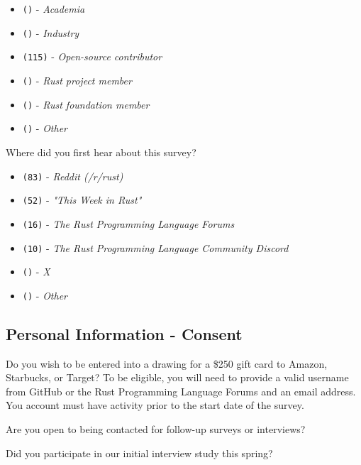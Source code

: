 \begin{protocol}
\begin{itemize}
\item \texttt{()} - \textit{Academia}
\item \texttt{()} - \textit{Industry}
\item \texttt{(115)} - \textit{Open-source contributor}
\item \texttt{(\space {})} - \textit{Rust project member}
\item \texttt{(\space{})} - \textit{Rust foundation member}
\item \texttt{(\space {})} - \textit{Other}
\end{itemize}
\item \label{survey:dq5}  Where did you first hear about this survey?
\begin{itemize}
\item \texttt{(83)} - \textit{Reddit (/r/rust)}
\item \texttt{(52)} - \textit{"This Week in Rust"}
\item \texttt{(16)} - \textit{The Rust Programming Language Forums}
\item \texttt{(10)} - \textit{The Rust Programming Language Community Discord}
\item \texttt{()} - \textit{X}
\item \texttt{()} - \textit{Other}
\end{itemize}
\end{protocol}

\subsection{Personal Information - Consent}
\label{survey:sec:pic}
\begin{protocol}
\item \label{survey:picq1}  Do you wish to be entered into a drawing for a \$250 gift card to Amazon, Starbucks, or Target? To be eligible, you will need to provide a valid username from GitHub or the Rust Programming Language Forums and an email address. You account must have activity prior to the start date of the survey.
\item \label{survey:picq2}  Are you open to being contacted for follow-up surveys or interviews?
\item \label{survey:picq3}  Did you participate in our initial interview study this spring? 
\end{protocol}

